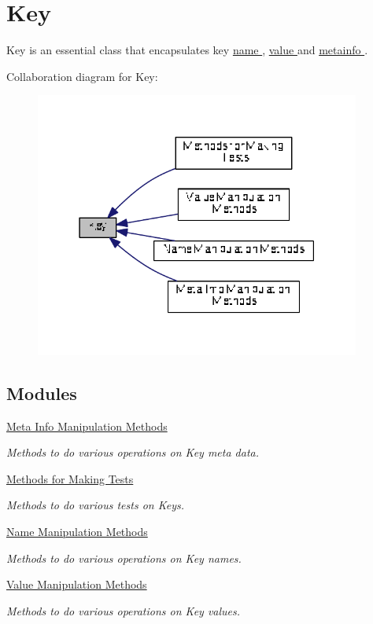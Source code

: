 \hypertarget{group__key}{\section{Key}
\label{group__key}
}


Key is an essential class that encapsulates key \hyperlink{group__keyname}{name }, \hyperlink{group__keyvalue}{value } and \hyperlink{group__keymeta}{metainfo }.  


Collaboration diagram for Key\+:
\nopagebreak
\begin{figure}[H]
\begin{center}
\leavevmode
\includegraphics[width=303pt]{group__key}
\end{center}
\end{figure}
\subsection*{Modules}
\begin{DoxyCompactItemize}
\item 
\hyperlink{group__keymeta}{Meta Info Manipulation Methods}
\begin{DoxyCompactList}\small\item\em Methods to do various operations on Key meta data. \end{DoxyCompactList}\item 
\hyperlink{group__keytest}{Methods for Making Tests}
\begin{DoxyCompactList}\small\item\em Methods to do various tests on Keys. \end{DoxyCompactList}\item 
\hyperlink{group__keyname}{Name Manipulation Methods}
\begin{DoxyCompactList}\small\item\em Methods to do various operations on Key names. \end{DoxyCompactList}\item 
\hyperlink{group__keyvalue}{Value Manipulation Methods}
\begin{DoxyCompactList}\small\item\em Methods to do various operations on Key values. \end{DoxyCompactList}\end{DoxyCompactItemize}
